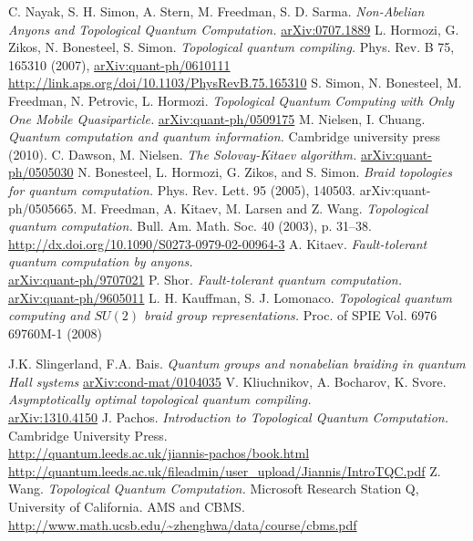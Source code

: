 \documentclass[a4paper,10pt,oneside]{book}
\theoremstyle{plain}
\theoremstyle{definition}
\theoremstyle{remark}
\begin{document}
\begin{thebibliography}{99}
   C. Nayak, S. H. Simon, A. Stern, M. Freedman, S. D. Sarma. \textit{Non-Abelian Anyons and Topological Quantum Computation.} \href{https://arxiv.org/pdf/0707.1889.pdf}{arXiv:0707.1889}
   L. Hormozi, G. Zikos, N. Bonesteel, S. Simon. \textit{Topological quantum compiling.} Phys. Rev. B 75, 165310 (2007), \href{https://arxiv.org/abs/quant-ph/0610111}{arXiv:quant-ph/0610111} \\ \url{http://link.aps.org/doi/10.1103/PhysRevB.75.165310}
   S. Simon, N. Bonesteel, M. Freedman, N. Petrovic, L. Hormozi. \textit{Topological Quantum Computing with Only One Mobile Quasiparticle.} \href{https://arxiv.org/abs/quant-ph/0509175}{arXiv:quant-ph/0509175}
   M. Nielsen, I. Chuang. \textit{Quantum computation and quantum information.} Cambridge university press (2010).
   C. Dawson, M. Nielsen. \textit{The Solovay-Kitaev algorithm.} \href{https://arxiv.org/abs/quant-ph/0505030}{arXiv:quant-ph/0505030}
   N. Bonesteel, L. Hormozi, G. Zikos, and S. Simon. \textit{Braid topologies for quantum computation.} Phys. Rev. Lett. 95 (2005), 140503. arXiv:quant-ph/0505665.
   M. Freedman, A. Kitaev, M. Larsen and Z. Wang. \textit{Topological quantum computation.} Bull. Am. Math. Soc. 40 (2003), p. 31–38. \\ \url{http://dx.doi.org/10.1090/S0273-0979-02-00964-3}
   A. Kitaev. \textit{Fault-tolerant quantum computation by anyons.} \\ \href{https://arxiv.org/abs/quant-ph/9707021}{arXiv:quant-ph/9707021}
   P. Shor. \textit{Fault-tolerant quantum computation.} \href{https://arxiv.org/abs/quant-ph/9605011}{arXiv:quant-ph/9605011}
   L. H. Kauffman, S. J. Lomonaco. \textit{Topological quantum computing and $SU(2)$ braid group representations.} Proc. of SPIE Vol. 6976  69760M-1 (2008)

   J.K. Slingerland, F.A. Bais. \textit{Quantum groups and nonabelian braiding in quantum Hall systems} \href{https://arxiv.org/abs/cond-mat/0104035}{arXiv:cond-mat/0104035}
   V. Kliuchnikov, A. Bocharov, K. Svore. \textit{Asymptotically optimal topological quantum compiling.} \\ \href{https://arxiv.org/abs/1310.4150}{arXiv:1310.4150}
   J. Pachos. \textit{Introduction to Topological Quantum Computation.} Cambridge University Press. \\ \url{http://quantum.leeds.ac.uk/jiannis-pachos/book.html} \\ \url{http://quantum.leeds.ac.uk/fileadmin/user_upload/Jiannis/IntroTQC.pdf}
   Z. Wang. \textit{Topological Quantum Computation.} Microsoft Research Station Q, University of California. AMS and CBMS. \url{http://www.math.ucsb.edu/~zhenghwa/data/course/cbms.pdf}


\end{thebibliography}
\end{document}
